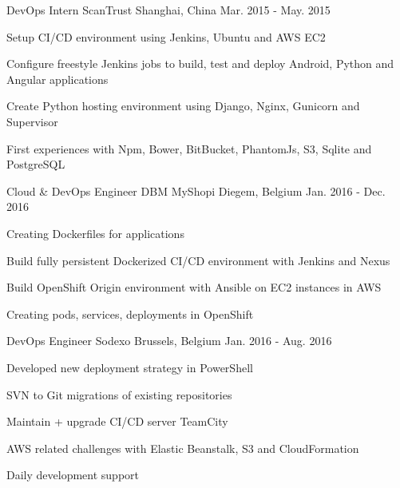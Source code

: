 

\begin{cventries}

  \cventry
    {DevOps Intern} %
    {ScanTrust} %
    {Shanghai, China} %
    {Mar. 2015 - May. 2015} %
    {
      \begin{cvitems} %
        \item {Setup CI/CD environment using Jenkins, Ubuntu and AWS EC2}
        \item {Configure freestyle Jenkins jobs to build, test and deploy Android, Python and Angular applications}
        \item {Create Python hosting environment using Django, Nginx, Gunicorn and Supervisor}        
        \item {First experiences with Npm, Bower, BitBucket, PhantomJs, S3, Sqlite and PostgreSQL}
      \end{cvitems}
    }

  \cventry
    {Cloud \& DevOps Engineer} %
    {DBM MyShopi} %
    {Diegem, Belgium} %
    {Jan. 2016 - Dec. 2016} %
    {
      \begin{cvitems} %
        \item {Creating Dockerfiles for applications}
        \item {Build fully persistent Dockerized CI/CD environment with Jenkins and Nexus}
        \item {Build OpenShift Origin environment with Ansible on EC2 instances in AWS}
        \item {Creating pods, services, deployments in OpenShift}
      \end{cvitems}
    }

  \cventry
    {DevOps Engineer} %
    {Sodexo} %
    {Brussels, Belgium} %
    {Jan. 2016 - Aug. 2016} %
    {
      \begin{cvitems} %
        \item {Developed new deployment strategy in PowerShell}
        \item {SVN to Git migrations of existing repositories}
        \item {Maintain + upgrade CI/CD server TeamCity}
        \item {AWS related challenges with Elastic Beanstalk, S3 and CloudFormation}
        \item {Daily development support}
      \end{cvitems}
    }


\end{cventries}
